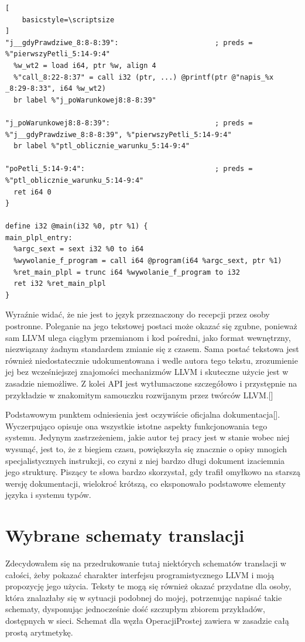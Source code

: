 \begin{lstlisting}[
    basicstyle=\scriptsize
]
"j__gdyPrawdziwe_8:8-8:39":                       ; preds = %"pierwszyPetli_5:14-9:4"
  %w_wt2 = load i64, ptr %w, align 4
  %"call_8:22-8:37" = call i32 (ptr, ...) @printf(ptr @"napis_%x _8:29-8:33", i64 %w_wt2)
  br label %"j_poWarunkowej8:8-8:39"

"j_poWarunkowej8:8-8:39":                         ; preds = %"j__gdyPrawdziwe_8:8-8:39", %"pierwszyPetli_5:14-9:4"
  br label %"ptl_oblicznie_warunku_5:14-9:4"

"poPetli_5:14-9:4":                               ; preds = %"ptl_oblicznie_warunku_5:14-9:4"
  ret i64 0
}

define i32 @main(i32 %0, ptr %1) {
main_plpl_entry:
  %argc_sext = sext i32 %0 to i64
  %wywolanie_f_program = call i64 @program(i64 %argc_sext, ptr %1)
  %ret_main_plpl = trunc i64 %wywolanie_f_program to i32
  ret i32 %ret_main_plpl
}

\end{lstlisting}

Wyraźnie widać, że nie jest to język przeznaczony do recepcji przez osoby postronne. Poleganie na jego tekstowej postaci może okazać się zgubne, ponieważ sam LLVM ulega ciągłym przemianom i kod pośredni, jako format wewnętrzny, niezwiązany żadnym standardem zmianie się z czasem. Sama postać tekstowa jest również niedostatecznie udokumentowana i wedle autora tego tekstu, zrozumienie jej bez wcześniejszej znajomości mechanizmów LLVM i skuteczne użycie jest w zasadzie niemożliwe. Z kolei API jest wytłumaczone szczegółowo i przystępnie na przykładzie w znakomitym samouczku rozwijanym przez twórców LLVM.[] 

Podstawowym punktem odniesienia  jest oczywiście oficjalna dokumentacja[]. Wyczerpująco opisuje ona wszystkie istotne aspekty funkcjonowania tego systemu. Jedynym zastrzeżeniem, jakie autor tej pracy jest w stanie wobec niej wysunąć, jest to, że z biegiem czasu, powiększyła się znacznie o opisy mnogich specjalistycznych instrukcji, co czyni z niej bardzo długi dokument izaciemnia jego strukturę. Piszący te słowa bardzo skorzystał, gdy trafił omyłkowo na starszą wersję dokumentacji, wielokroć krótszą, co eksponowało podstawowe elementy języka i systemu typów.

\section{Wybrane schematy translacji}
Zdecydowałem się na przedrukowanie tutaj niektórych schematów translacji w całości, żeby pokazać charakter interfejsu programistycznego LLVM i moją propozycję jego użycia. Teksty te mogą się również okazać przydatne dla osoby, która znalazłaby się w sytuacji podobnej do mojej, potrzenując napisać takie schematy, dysponując jednocześnie dość szczupłym zbiorem przykładów, dostępnych w sieci.
Schemat dla węzła OperacjiProstej zawiera w zasadzie całą prostą arytmetykę.

